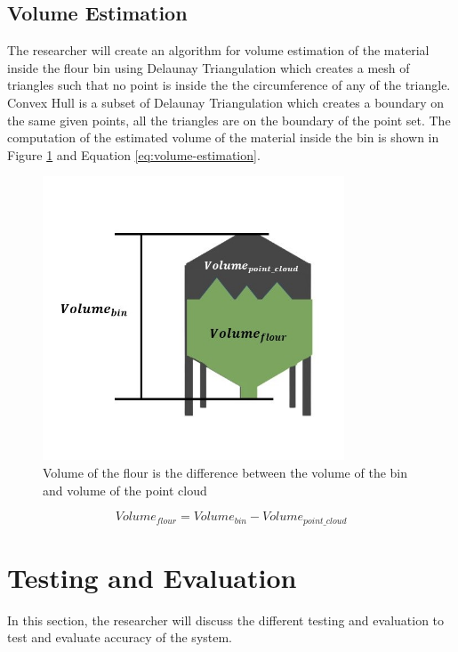 \subsection{Volume Estimation}
\label{method:sec:Volume Estimation}
The researcher will create an algorithm for volume estimation of the material inside the flour bin using Delaunay Triangulation which creates a mesh of triangles such that no point is inside the the circumference of any of the triangle. Convex Hull is a subset of Delaunay Triangulation which creates a boundary on the same given points, all the triangles are on the boundary of the point set. The computation of the estimated volume of the material inside the bin is shown in Figure \ref{fig:volume-estimation-figure} and Equation \eqref{eq:volume-estimation}.

\begin{figure}[H]
    \centering
    \includegraphics[width=0.8\textwidth]{Figures/volume-estimation-figure}
    \caption{Volume of the flour is the difference between the volume of the bin and volume of the point cloud}
    \label{fig:volume-estimation-figure}
\end{figure}

\begin{equation}
    Volume_{flour} = Volume_{bin} - Volume_{point\_cloud}
    \label{eq:volume-estimation}
\end{equation}

\section{Testing and Evaluation}
\label{method:sec:Testing and Evaluation}
In this section, the researcher will discuss the different testing and evaluation to test and evaluate accuracy of the system.

